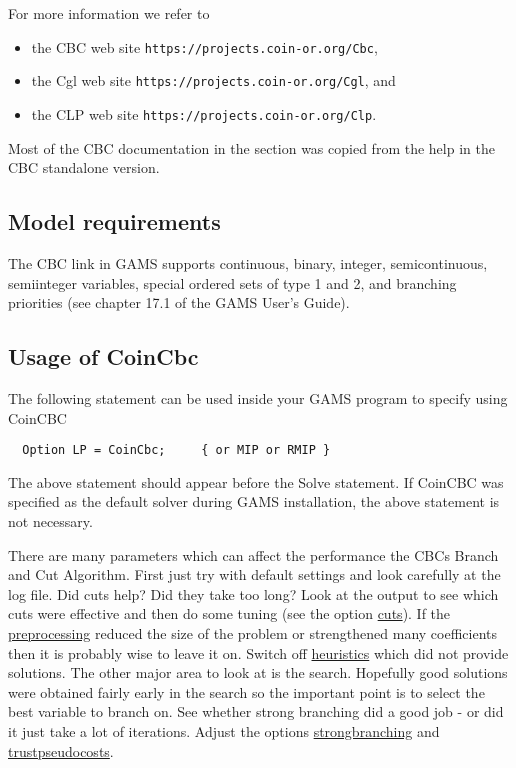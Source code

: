 For more information we refer to
\begin{itemize}
\item the CBC web site \texttt{https://projects.coin-or.org/Cbc},
\item the Cgl web site \texttt{https://projects.coin-or.org/Cgl}, and
\item the CLP web site \texttt{https://projects.coin-or.org/Clp}.
\end{itemize}
Most of the CBC documentation in the section was copied from the help in the CBC standalone version.

\subsection{Model requirements}

The CBC link in GAMS supports continuous, binary, integer, semicontinuous, semiinteger variables, special ordered sets of type 1 and 2, and branching priorities (see chapter 17.1 of the GAMS User's Guide).

\subsection{Usage of CoinCbc}

The following statement can be used inside your GAMS program to specify using CoinCBC
\begin{verbatim}
  Option LP = CoinCbc;     { or MIP or RMIP }
\end{verbatim}

The above statement should appear before the Solve statement.
If CoinCBC was specified as the default solver during GAMS installation, the above statement is not necessary.

There are many parameters which can affect the performance the CBCs Branch and Cut Algorithm.
First just try with default settings and look carefully at the log file.
Did cuts help? Did they take too long? Look at the output to see which cuts were effective and then do some tuning (see the option \hyperlink{cuts}{cuts}).
If the \hyperlink{preprocess}{preprocessing} reduced the size of the problem or strengthened many coefficients then it is probably wise to leave it on.
Switch off \hyperlink{heuristics}{heuristics} which did not provide solutions.
The other major area to look at is the search. Hopefully good solutions were obtained fairly early in the search so the important point is to select the best variable to branch on.
See whether strong branching did a good job - or did it just take a lot of iterations.
Adjust the options \hyperlink{strongbranching}{strongbranching} and \hyperlink{trustpseudocosts}{trustpseudocosts}.

